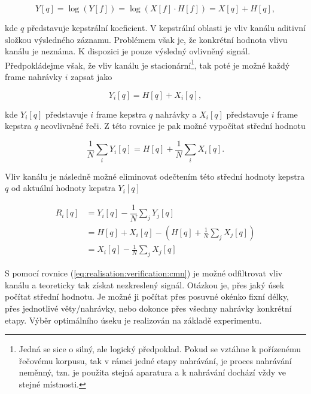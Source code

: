 \begin{equation}
  Y\left[q\right] = \log\left(Y\left[f\right]\right) = \log\left(X\left[f\right] \cdot H\left[f\right]\right) = X\left[q\right] + H\left[q\right],
\end{equation}

\noindent kde $q$ představuje kepstrální koeficient. V kepstrální oblasti je vliv kanálu aditivní složkou výsledného záznamu. Problémem však je, že konkrétní hodnota vlivu kanálu je neznáma. K dispozici je pouze výsledný ovlivněný signál. Předpokládejme však, že vliv kanálu je stacionární\footnote{Jedná se sice o silný, ale logický předpoklad. Pokud se vztáhne k pořízenému řečovému korpusu, tak v rámci jedné etapy nahrávání, je proces nahrávání neměnný, tzn. je použita stejná aparatura a k nahrávání dochází vždy ve stejné místnosti.}, tak poté je možné každý frame nahrávky $i$ zapsat jako

\begin{equation}
  Y_i\left[q\right] = H\left[q\right] + X_i\left[q\right],
\end{equation}

\noindent kde $Y_i\left[q\right]$ představuje $i$ frame kepstra $q$ nahrávky a $X_i\left[q\right]$ představuje $i$ frame kepstra $q$ neovlivněné řeči. Z této rovnice je pak možné vypočítat střední hodnotu

\begin{equation}
  \frac{1}{N} \sum_i Y_i\left[q\right] = H\left[q\right] + \frac{1}{N} \sum_i X_i\left[q\right].
\end{equation}

\noindent Vliv kanálu je následně možné eliminovat odečtením této střední hodnoty kepstra $q$ od aktuální hodnoty kepstra $Y_i\left[q\right]$

\begin{align}
  R_i\left[q\right] &= Y_i\left[q\right] - \dfrac{1}{N}\sum_{j} Y_j\left[q\right] \nonumber  \\
  &= H\left[q\right] + X_i\left[q\right] - \left( H\left[q\right] + \frac{1}{N} \sum_j X_j\left[q\right] \right) \nonumber  \\
  &= X_i\left[q\right] - \frac{1}{N} \sum_j X_j\left[q\right]
  \label{eq:realisation:verification:cmn}
\end{align}

\noindent S pomocí rovnice (\ref{eq:realisation:verification:cmn}) je možné odfiltrovat vliv kanálu a teoreticky tak získat nezkreslený signál. Otázkou je, přes jaký úsek počítat střední hodnotu. Je možné ji počítat přes posuvné okénko fixní délky, přes jednotlivé věty/nahrávky, nebo dokonce přes všechny nahrávky konkrétní etapy. Výběr optimálního úseku je realizován na základě experimentu.

